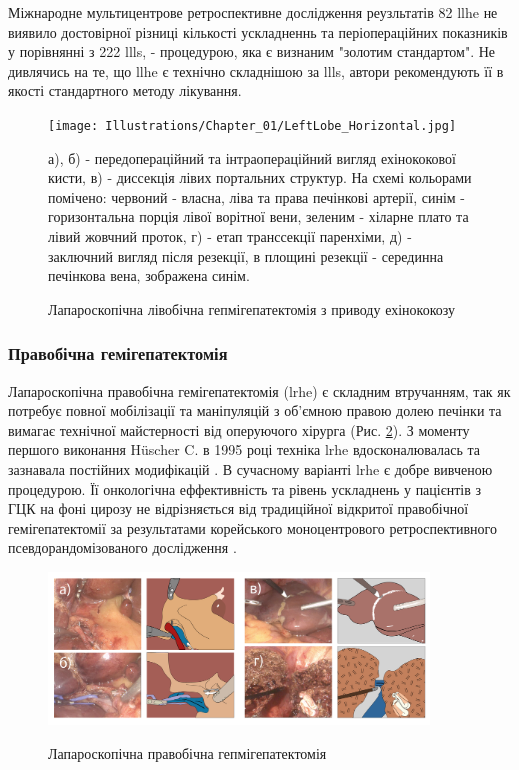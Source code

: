 \begin{refsection}
Міжнародне мультицентрове ретроспективне дослідження реузльтатів 82 \acrshort{llhe} \cite{Belli2013a} не виявило достовірної різниці кількості ускладненнь та періопераційних показників у порівнянні з 222 \acrshort{llls}, - процедурою, яка є визнаним "золотим стандартом". Не дивлячись на те, що \acrshort{llhe} є технічно складнішою за \acrshort{llls}, автори рекомендують її в якості стандартного методу лікування. 

\begin{figure}[h]
\caption{Лапароскопічна лівобічна гепмігепатектомія з приводу ехінококозу}

\texttt{[image: Illustrations/Chapter\_01/LeftLobe\_Horizontal.jpg]}
\label{fig:LeftLobe}

\medskip
\small
 а), б) - передопераційний та інтраопераційний вигляд ехінококової кисти, в) - диссекція лівих портальних структур. На схемі кольорами помічено: червоний - власна, ліва та права печінкові артерії, синім - горизонтальна порція лівої ворітної вени, зеленим - хіларне плато та лівий жовчний проток, г) - етап транссекції паренхіми, д) - заключний вигляд після резекції, в площині резекції - серединна печінкова вена, зображена синім.

\end{figure}

\subsubsection{Правобічна гемігепатектомія}

Лапароскопічна правобічна гемігепатектомія (\acrshort{lrhe}) є складним втручанням, так як потребує повної мобілізації та маніпуляцій з об'ємною правою долею печінки та вимагає технічної майстерності від оперуючого хірурга (Рис. \ref{fig:RightLobe}). З моменту першого виконання Hüscher C. в 1995 році \cite{Huscher1997} техніка \acrshort{lrhe} вдосконалювалась та зазнавала постійних модифікацій \cite{Gayet2007, Dagher2008, Homma2019, Kim2017a}. В сучасному варіанті \acrshort{lrhe} є добре вивченою процедурою. Її онкологічна еффективність та рівень ускладнень у пацієнтів з ГЦК на фоні цирозу не відрізняється від традиційної відкритої правобічної гемігепатектомії за результатами корейського моноцентрового ретроспективного псевдорандомізованого дослідження \cite{Yoon2017b}. 

\begin{figure}[h]
\caption{Лапароскопічна правобічна гепмігепатектомія}

\includegraphics[width=0.9\textwidth]{Illustrations/Chapter_01/RightLobe_Horizontal.png}
\label{fig:RightLobe}


\end{figure}
\end{refsection}
